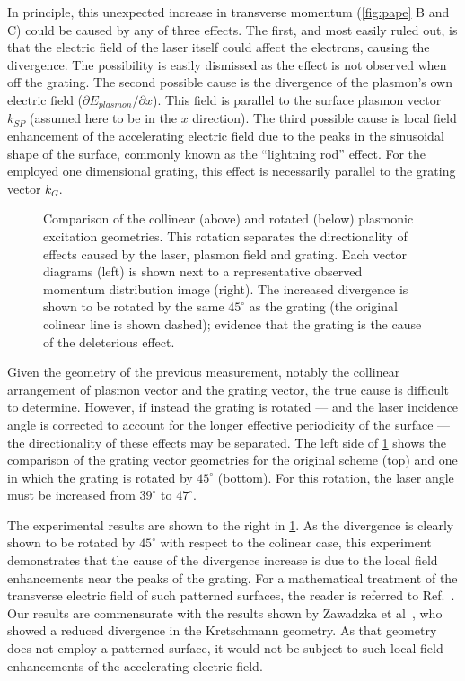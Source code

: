 In principle, this unexpected increase in transverse momentum (\ref{fig:pape} B and C) could be caused by any of three effects.
The first, and most easily ruled out, is that the electric field of the laser itself could affect the electrons, causing the divergence.
The possibility is easily dismissed as the effect is not observed when off the grating.
The second possible cause is the divergence of the plasmon's own electric field ($\partial E_{plasmon} / \partial x$).
This field is parallel to the surface plasmon vector $k_{SP}$ (assumed here to be in the $x$ direction).
The third possible cause is local field enhancement of the accelerating electric field due to the peaks in the sinusoidal shape of the surface, commonly known as the ``lightning rod'' effect.
For the employed one dimensional grating, this effect is necessarily parallel to the grating vector $k_G$.

\begin{figure}
  \centering
  
  \caption[Comparison of the colinear and rotated plasmonic excitation geometries]{
    Comparison of the collinear (above) and rotated (below) plasmonic excitation geometries.
    This rotation separates the directionality of effects caused by the laser, plasmon field and grating.
    Each vector diagrams (left) is shown next to a representative observed momentum distribution image (right).
    The increased divergence is shown to be rotated by the same $45^{\circ}$ as the grating (the original colinear line is shown dashed); evidence that the grating is the cause of the deleterious effect.
  }
  \label{fig:rotated}
\end{figure}

Given the geometry of the previous measurement, notably the collinear arrangement of plasmon vector and the grating vector, the true cause is difficult to determine.
However, if instead the grating is rotated --- and the laser incidence angle is corrected to account for the longer effective periodicity of the surface --- the directionality of these effects may be separated.
The left side of \ref{fig:rotated} shows the comparison of the grating vector geometries for the original scheme (top) and one in which the grating is rotated by $45^{\circ}$ (bottom).
For this rotation, the laser angle must be increased from $39^{\circ}$ to $47^{\circ}$.

The experimental results are shown to the right in \ref{fig:rotated}.
As the divergence is clearly shown to be rotated by $45^{\circ}$ with respect to the colinear case, this experiment demonstrates that the cause of the divergence increase is due to the local field enhancements near the peaks of the grating.
For a mathematical treatment of the transverse electric field of such patterned surfaces, the reader is referred to Ref.~\cite{watts_sharp_1997}. 
Our results are commensurate with the results shown by Zawadzka et al~\cite{zawadzka_evanescent_2001}, who showed a reduced divergence in the Kretschmann geometry.
As that geometry does not employ a patterned surface, it would not be subject to such local field enhancements of the accelerating electric field.


